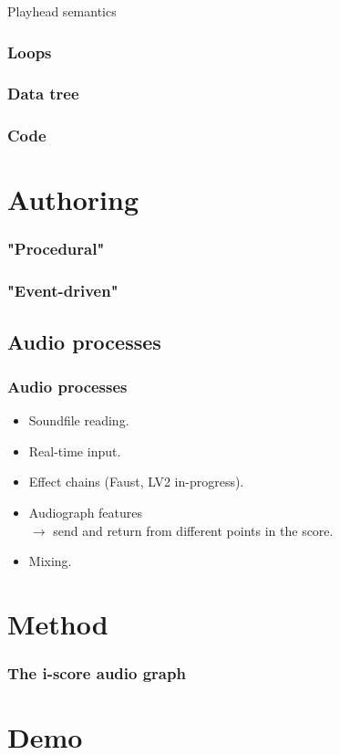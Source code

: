 \documentclass{beamer}
\begin{document}
\begin{frame}
    Playhead semantics
\end{frame}

\begin{frame}
    \Large
    \frametitle{Loops}  
\end{frame}

\begin{frame}
    \Large
    \frametitle{Data tree}  
\end{frame}

\begin{frame}
    \Large
    \frametitle{Code}  
\end{frame}

\section{Authoring}
\begin{frame}
    \frametitle{"Procedural"}
\end{frame}
\begin{frame}
    \frametitle{"Event-driven"}
\end{frame}


\subsection{Audio processes}
\begin{frame}	
    \frametitle{Audio processes}    
    \LARGE
    \begin{itemize}
        \item Soundfile reading.
        \item Real-time input.
        \item Effect chains (Faust, LV2 in-progress).
        \item Audiograph features~\\$\rightarrow$ send and return from different points in the score.
        \item Mixing.
    \end{itemize}    
\end{frame}

\section{Method}
\begin{frame}
    \frametitle{The i-score audio graph}    
\end{frame}


\section{Demo}
\end{document}

